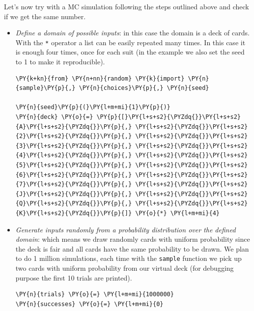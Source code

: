 Let's now try with a MC simulation following the steps outlined above and check if we get the same number.
\begin{itemize}
\item \emph{Define a domain of possible inputs}: in this case the domain is a deck of cards. With the \texttt{*} operator a list can be easily repeated many times. In this case it is enough four times, once for each suit (in the example we also set the seed to 1 to make it reproducible).

\begin{tcolorbox}[breakable, size=fbox, boxrule=1pt, pad at break*=1mm,colback=cellbackground, colframe=cellborder]
\begin{Verbatim}[commandchars=\\\{\}]
\PY{k+kn}{from} \PY{n+nn}{random} \PY{k}{import} \PY{n}{sample}\PY{p}{,} \PY{n}{choices}\PY{p}{,} \PY{n}{seed}

\PY{n}{seed}\PY{p}{(}\PY{l+m+mi}{1}\PY{p}{)}
\PY{n}{deck} \PY{o}{=} \PY{p}{[}\PY{l+s+s2}{\PYZdq{}}\PY{l+s+s2}{A}\PY{l+s+s2}{\PYZdq{}}\PY{p}{,} \PY{l+s+s2}{\PYZdq{}}\PY{l+s+s2}{2}\PY{l+s+s2}{\PYZdq{}}\PY{p}{,} \PY{l+s+s2}{\PYZdq{}}\PY{l+s+s2}{3}\PY{l+s+s2}{\PYZdq{}}\PY{p}{,} \PY{l+s+s2}{\PYZdq{}}\PY{l+s+s2}{4}\PY{l+s+s2}{\PYZdq{}}\PY{p}{,} \PY{l+s+s2}{\PYZdq{}}\PY{l+s+s2}{5}\PY{l+s+s2}{\PYZdq{}}\PY{p}{,} \PY{l+s+s2}{\PYZdq{}}\PY{l+s+s2}{6}\PY{l+s+s2}{\PYZdq{}}\PY{p}{,} \PY{l+s+s2}{\PYZdq{}}\PY{l+s+s2}{7}\PY{l+s+s2}{\PYZdq{}}\PY{p}{,} \PY{l+s+s2}{\PYZdq{}}\PY{l+s+s2}{J}\PY{l+s+s2}{\PYZdq{}}\PY{p}{,} \PY{l+s+s2}{\PYZdq{}}\PY{l+s+s2}{Q}\PY{l+s+s2}{\PYZdq{}}\PY{p}{,} \PY{l+s+s2}{\PYZdq{}}\PY{l+s+s2}{K}\PY{l+s+s2}{\PYZdq{}}\PY{p}{]} \PY{o}{*} \PY{l+m+mi}{4}
 \end{Verbatim}
\end{tcolorbox}

\item \emph{Generate inputs randomly from a probability distribution over the defined domain}: which means we draw randomly cards with uniform probability since the deck is fair and all cards have the same probability to be drawn. 
We plan to do 1 million simulations, each time with the \texttt{sample} function we pick up two cards with uniform probability from our virtual deck (for debugging purpose the first 10 trials are printed).

\begin{tcolorbox}[breakable, size=fbox, boxrule=1pt, pad at break*=1mm,colback=cellbackground, colframe=cellborder]
\begin{Verbatim}[commandchars=\\\{\}]
\PY{n}{trials} \PY{o}{=} \PY{l+m+mi}{1000000}
\PY{n}{successes} \PY{o}{=} \PY{l+m+mi}{0}


\end{Verbatim}
\end{tcolorbox}
\end{itemize}
